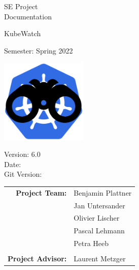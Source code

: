 \begin{titlepage}

    \begin{center}


        \vspace{1 cm}

        {\Large SE Project \\ Documentation} \\

        \vspace{0.5cm}

        {\Huge KubeWatch}

        \vspace{0.5cm}

        Semester: Spring 2022

        \vspace{0.5 cm}

        \includegraphics[height=4cm]{resources/KubeWatchLogo.png}

        \vspace{0.5 cm}

        Version: 6.0 \\
        Date: \DTMnow \\
        Git Version: \gitDescription
        \vspace{1 cm}

        \begin{tabular}{rl}
            \textbf{Project Team:}    & Benjamin Plattner \\
                                      & Jan Untersander \\
                                      & Olivier Lischer \\
                                      & Pascal Lehmann \\
                                      & Petra Heeb \\
                                      &                    \\
            \textbf{Project Advisor:} & Laurent Metzger
        \end{tabular}


\end{center}
\end{titlepage}
